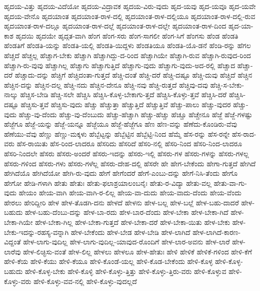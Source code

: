 {ಹೃದಯ-ವಿತ್ತು
ಹೃದಯ-ವಿದೆಯೋ
ಹೃದಯ-ವಿದ್ರಾವಕ
ಹೃದಯ-ವಿರು-ವುದು
ಹೃದ-ಯವು
ಹೃದ-ಯವೂ
ಹೃದ-ಯವೇ
ಹೃದಯ-ವೇನೊ
ಹೃದಯಾಂತ
ಹೃದಯಾಂತ-ರಾಳ-ದಲ್ಲಿ
ಹೃದಯಾಂತ-ರಾಳ-ದಲ್ಲಿಯೂ
ಹೃದಯಾಂತ-ರಾಳ-ದಲ್ಲಿ-ರುವ
ಹೃದಯಾಂತ-ರಾಳ-ದಲ್ಲೂ
ಹೃದಯಾಂತ-ರಾಳ-ದಲ್ಲೆ
ಹೃದಯಾಂತ-ರಾಳ-ದಲ್ಲೇ
ಹೃದಯಾಂತ-ರಾಳ-ದಿಂದ
ಹೃದ-ಯಾ-ಕಾಶ
ಹೃದಯಿ
ಹೃದಯೇ
ಹೃದ್ಗತ-ವಾಗಿ
ಹೆಂಗ
ಹೆಂಗ-ಸರು
ಹೆಂಗ-ಸಾಗಲೀ
ಹೆಂಗ-ಸಿಗೆ
ಹೆಂಗಸು
ಹೆಂಡ
ಹೆಂಡತಿ
ಹೆಂಡತಿಗೆ
ಹೆಂಡತಿ-ಯನ್ನು
ಹೆಂಡತಿ-ಯಲ್ಲಿ
ಹೆಂಡತಿ-ಯಿದ್ದಳು
ಹೆಂಡತಿಯೂ
ಹೆಂಡತಿ-ಯೊ-ಡನೆ
ಹೆಂಡಿ-ರನ್ನು
ಹೆಗಲ
ಹೆಚ್ಚದೆ
ಹೆಚ್ಚಲ್ಲ
ಹೆಚ್ಚಾಗ-ಬೇಕು
ಹೆಚ್ಚಾಗಿ
ಹೆಚ್ಚಾಗಿದ್ದು-ದ-ರಿಂದ
ಹೆಚ್ಚಾಗಿಯೇ
ಹೆಚ್ಚಾಗಿ-ರುವ
ಹೆಚ್ಚಾಗಿ-ರುವುದ-ರಿಂದ
ಹೆಚ್ಚಾಗಿ-ರು-ವುವು
ಹೆಚ್ಚಾಗಿಲ್ಲ
ಹೆಚ್ಚಾಗು
ಹೆಚ್ಚಾಗುತ್ತಿದೆ
ಹೆಚ್ಚಾಗು-ವುದು
ಹೆಚ್ಚಾಗು-ವುದು-ಅದ-ರಲ್ಲಿ
ಹೆಚ್ಚಾದ
ಹೆಚ್ಚಾ-ದರೆ
ಹೆಚ್ಚಾದು-ದನ್ನು
ಹೆಚ್ಚಿಗೆ
ಹೆಚ್ಚಿದಂತಾ-ಗುತ್ತದೆ
ಹೆಚ್ಚಿ-ದಂತೆ
ಹೆಚ್ಚಿ-ದರೆ
ಹೆಚ್ಚಿ-ದಷ್ಟೂ
ಹೆಚ್ಚಿ-ದುವು
ಹೆಚ್ಚಿದೆ
ಹೆಚ್ಚಿನ
ಹೆಚ್ಚಿನ-ದನ್ನು
ಹೆಚ್ಚಿನ-ದಲ್ಲ
ಹೆಚ್ಚಿ-ನದು
ಹೆಚ್ಚಿನ-ದೇನೂ
ಹೆಚ್ಚಿ-ನವು
ಹೆಚ್ಚಿ-ರುತ್ತದೆ
ಹೆಚ್ಚಿವು-ದವು
ಹೆಚ್ಚಿ-ಸ-ಬೇಕು-ನಾಲ್ಕು
ಹೆಚ್ಚಿಸ-ಬೇಡಿ
ಹೆಚ್ಚಿ-ಸಲೇ
ಹೆಚ್ಚಿಸಿ
ಹೆಚ್ಚಿಸಿ-ಕೊಳ್ಳ-ಬೇಕಾಗು-ತ್ತದೆ
ಹೆಚ್ಚಿಸಿ-ಕೊಳ್ಳು-ತ್ತವೆ
ಹೆಚ್ಚಿಸಿ-ದರೆ
ಹೆಚ್ಚಿಸಿ-ದಷ್ಟೂ
ಹೆಚ್ಚಿಸು-ತ್ತವೆ
ಹೆಚ್ಚಿಸು-ವುದು
ಹೆಚ್ಚು
ಹೆಚ್ಚುತ್ತಾ
ಹೆಚ್ಚುತ್ತಿದೆ
ಹೆಚ್ಚುತ್ತಿವೆ
ಹೆಚ್ಚು-ಪಾಲು
ಹೆಚ್ಚು-ವುದರ
ಹೆಚ್ಚು-ವುದು
ಹೆಚ್ಚು-ವು-ದೆಂದು
ಹೆಚ್ಚು-ವು-ದೆಂಬುದು
ಹೆಚ್ಚು-ಹೆಚ್ಚಾಗಿ
ಹೆಚ್ಚು-ಹೆಚ್ಚು
ಹೆಚ್ಚೂ
ಹೆಚ್ಚೇನೂ
ಹೆಜ್ಜೆ
ಹೆಜ್ಜೆ-ಗಳಷ್ಟು
ಹೆಜ್ಜೆಗೂ
ಹೆಜ್ಜೆ-ಯನ್ನು
ಹೆಜ್ಜೆ-ಯನ್ನೂ
ಹೆಜ್ಜೆಯೂ
ಹೆಜ್ಜೆ-ಹೆಜ್ಜೆಗೂ
ಹೆಣ
ಹೆಣ-ವನ್ನು
ಹೆಣೆದು-ಕೊಂಡಿರು-ವೆವು
ಹೆಣೆಯು-ವೆವು
ಹೆಣ್ಣು
ಹೆಣ್ಣು-ಮಕ್ಕಳು
ಹೆಬ್ಬೆಟ್ಟನ್ನು
ಹೆಬ್ಬೆಟ್ಟಿನ
ಹೆಬ್ಬೆಟ್ಟಿ-ನಿಂದ
ಹೆಮ್ಮೆ
ಹೆಸ-ರನ್ನು
ಹೆಸ-ರನ್ನೇ
ಹೆಸ-ರಾದ-ವರು
ಹೆಸ-ರಾಯಿತು
ಹೆಸ-ರಿಂದ-ಲಾದರೂ
ಹೆಸರಿದು
ಹೆಸರಿದೆ
ಹೆಸರಿ-ನಲ್ಲಿ
ಹೆಸರಿ-ನಿಂದ
ಹೆಸರಿ-ನಿಂದ-ಲಾದರೂ
ಹೆಸರಿ-ನಿಂದಲೇ
ಹೆಸರು
ಹೆಸರು-ಅಂದರೆ
ಹೆಸರು-ಇದನ್ನು
ಹೆಸರು-ಇಲ್ಲಿ
ಹೆಸರು-ಗಳ
ಹೆಸರು-ಗಳನ್ನು
ಹೆಸರು-ಗಳಲ್ಲ
ಹೆಸರು-ಗಳಿಂದ
ಹೆಸರು-ಗಳು
ಹೆಸರು-ಗಳೆಲ್ಲ
ಹೆಸರು-ದೇಹ-ದಲ್ಲಿ
ಹೆಸರೇ
ಹೇ
ಹೇಗ-ಬೇಕೆಂದು
ಹೇಗಾ-ಗುತ್ತದೆ
ಹೇಗಿದೆ
ಹೇಗಿದೆಯೊ
ಹೇಗಿದೆಯೋ
ಹೇಗಿ-ರು-ವುದು
ಹೇಗೆ
ಹೇಗೆಂದರೆ
ಹೇಗೆ-ಎಂಬು-ದನ್ನು
ಹೇಗೆ-ನಿಸಿ-ತೆಂದು
ಹೇಗೊ
ಹೇಗೋ
ಹೇಡಿ-ಗಳಾಗಿ
ಹೇತು
ಹೇತುಃ
ಹೇತು-ಫಲಾಶ್ರಯಾಲಂಬನೈಃ
ಹೇತು-ರ-ವಿದ್ಯಾ
ಹೇತು-ವಲ್ಲ
ಹೇತು-ವಾ-ಗು-ವುದು
ಹೇಯಂ
ಹೇಯ-ವಾಗಿ
ಹೇಯ-ವಾಗಿ-ರ-ಲಿಲ್ಲ
ಹೇಯ-ವಾ-ದುದು
ಹೇಯ-ವಾದು-ದೆಂದು
ಹೇಯ-ವೆಂದು
ಹೇರಲು
ಹೇರಿದ್ದೀರಿ
ಹೇಳ
ಹೇಳ-ತೊಡಗಿ-ದನು
ಹೇಳದೆ
ಹೇಳನು
ಹೇಳ-ಬಲ್ಲ
ಹೇಳ-ಬಲ್ಲೆ
ಹೇಳ-ಬಹು-ದಾದರೆ
ಹೇಳ-ಬಹುದು
ಹೇಳ-ಬಹು-ದೆಂಬು-ದನ್ನು
ಹೇಳ-ಬಾ-ರದು
ಹೇಳ-ಬಾರ-ದೆಂದು
ಹೇಳ-ಬೇಕಾ
ಹೇಳ-ಬೇಕಾ-ಗಿದೆ
ಹೇಳ-ಬೇಕಾ-ಗಿಯೇ
ಹೇಳ-ಬೇಕಾ-ಗಿಲ್ಲ
ಹೇಳ-ಬೇಕಾ-ಗುತ್ತದೆ
ಹೇಳ-ಬೇಕಾ-ದರೆ
ಹೇಳ-ಬೇಕಾ-ಯಿತು
ಹೇಳ-ಬೇಕು
ಹೇಳ-ಬೇಕು-ಇದನ್ನು-ರಹಸ್ಯ-ವನ್ನಾಗಿ
ಹೇಳ-ಬೇಕೆಂದು
ಹೇಳ-ಬೇಡ
ಹೇಳ-ಬೇಡಿ
ಹೇಳ-ಲಾಗಿದೆ
ಹೇಳ-ಲಾಗಿದೆ-ಕಾರಣ-ವಿದ್ದಂತೆ
ಹೇಳ-ಲಾಗು-ವುದಿಲ್ಲ
ಹೇಳ-ಲಾಗು-ವುದಿಲ್ಲ-ಯಾವುದ-ರೊಂದಿಗೆ
ಹೇಳ-ಲಾರ-ಅವನು
ಹೇಳ-ಲಾರೆ
ಹೇಳ-ಲಾರೆವು
ಹೇಳ-ಲಿಚ್ಛಿಸು-ವಂತೆ
ಹೇಳ-ಲಿಲ್ಲ
ಹೇಳಲು
ಹೇಳಲೂ
ಹೇಳ-ಹೇತುಃ
ಹೇಳಿ
ಹೇಳಿಕೆ
ಹೇಳಿಕೆ-ಗಳಿಂದ
ಹೇಳಿ-ಕೆಗೆ
ಹೇಳಿ-ಕೆಯ
ಹೇಳಿ-ಕೆಯು
ಹೇಳಿ-ಕೆಯೂ
ಹೇಳಿ-ಕೊಂಡೆ-ಯಲ್ಲ
ಹೇಳಿ-ಕೊಡ-ಬೇಕೆಂದು
ಹೇಳಿ-ಕೊಳ್ಳ
ಹೇಳಿ-ಕೊಳ್ಳ-ಬಹುದು
ಹೇಳಿ-ಕೊಳ್ಳ-ಬೇಕು
ಹೇಳಿ-ಕೊಳ್ಳಿ
ಹೇಳಿ-ಕೊಳ್ಳು-ತ್ತಿತ್ತು
ಹೇಳಿ-ಕೊಳ್ಳು-ತ್ತಿರು-ವರು
ಹೇಳಿ-ಕೊಳ್ಳುವ
ಹೇಳಿ-ಕೊಳ್ಳು-ವರು
ಹೇಳಿ-ಕೊಳ್ಳು-ವವ-ನಲ್ಲಿ
ಹೇಳಿ-ಕೊಳ್ಳು-ವುದಲ್ಲದೆ
}
